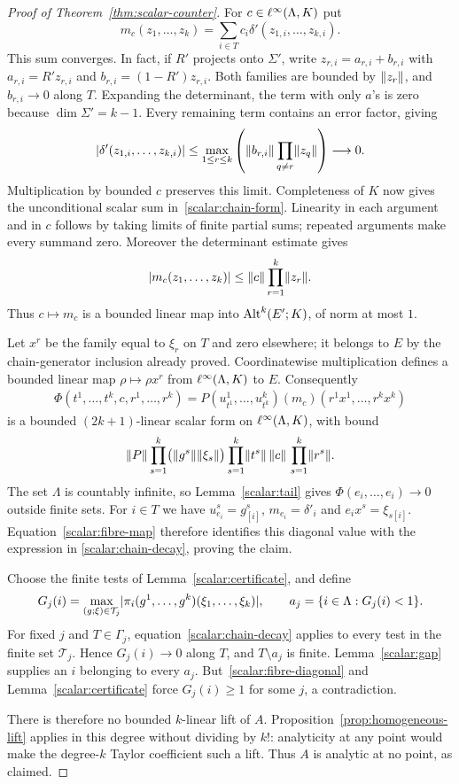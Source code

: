 \begin{proof}[Proof of Theorem~\ref{thm:scalar-counter}]
For $c\in\ell^\infty(\Lambda,K)$ put
\begin{equation}\label{scalar:chain-form}
 m_c(z_1,\dots,z_k)=\sum_{i\in T}c_i\delta'(z_{1,i},\dots,z_{k,i}).
\end{equation}
This sum converges. In fact, if $R'$ projects onto $\Sigma'$, write
$z_{r,i}=a_{r,i}+b_{r,i}$ with $a_{r,i}=R'z_{r,i}$ and $b_{r,i}=(1-R')z_{r,i}$. Both families are bounded
by $\lVert z_r\rVert$, and $b_{r,i}\to0$ along $T$. Expanding the determinant, the term with only $a$'s is
zero because $\dim\Sigma'=k-1$. Every remaining term contains an error factor, giving
\[
 \lvert \delta'(z_{1,i},\dots,z_{k,i})\rvert
 \le\max_{1\le r\le k}\left(\lVert b_{r,i}\rVert\prod_{q\ne r}\lVert z_q\rVert\right)
 \longrightarrow0.
\]
Multiplication by bounded $c$ preserves this limit. Completeness of $K$ now gives the unconditional
scalar sum in~\eqref{scalar:chain-form}. Linearity in each argument and in $c$ follows by taking limits
of finite partial sums; repeated arguments make every summand zero. Moreover the determinant estimate gives
\[
 \lvert m_c(z_1,\dots,z_k)\rvert\le\lVert c\rVert\prod_{r=1}^k\lVert z_r\rVert.
\]
Thus $c\mapsto m_c$ is a bounded linear map into $\operatorname{Alt}^k(E';K)$, of norm at most $1$.

Let $x^r$ be the family equal to $\xi_r$ on $T$ and zero elsewhere; it belongs to $E$ by the
chain-generator inclusion already proved. Coordinatewise multiplication defines a bounded linear map
$\rho\mapsto\rho x^r$ from $\ell^\infty(\Lambda,K)$ to $E$. Consequently
\[
 \begin{split}
 \Phi(t^1,\dots,t^k,c,r^1,\dots,r^k)
   =P(u^1_{t^1},\dots,u^k_{t^k})(m_c)(r^1x^1,\dots,r^kx^k)
 \end{split}
\]
is a bounded $(2k+1)$\nobreakdash-linear scalar form on $\ell^\infty(\Lambda,K)$, with bound
\[
 \lVert P\rVert\prod_{s=1}^k\bigl(\lVert g^s\rVert\lVert \xi_s\rVert\bigr)
       \prod_{s=1}^k\lVert t^s\rVert\,\lVert c\rVert\,\prod_{s=1}^k\lVert r^s\rVert.
\]
The set $\Lambda$ is countably infinite, so Lemma~\ref{scalar:tail} gives
$\Phi(e_i,\dots,e_i)\to0$ outside finite sets. For $i\in T$ we have
$u^s_{e_i}=g^s_{[i]}$, $m_{e_i}=\delta'_i$ and $e_i x^s=\xi_{s[i]}$.
Equation~\eqref{scalar:fibre-map} therefore identifies this diagonal value with the expression in
\eqref{scalar:chain-decay}, proving the claim.

Choose the finite tests of Lemma~\ref{scalar:certificate}, and define
\[
 G_j(i)=\max_{(g;\xi)\in\mathcal T_j}
       \lvert \pi_i(g^1,\dots,g^k)(\xi_1,\dots,\xi_k)\rvert,
 \qquad a_j=\{i\in\Lambda:G_j(i)<1\}.
\]
For fixed $j$ and $T\in\Gamma_j$, equation~\eqref{scalar:chain-decay} applies to every test in the finite
set $\mathcal T_j$. Hence $G_j(i)\to0$ along $T$, and $T\setminus a_j$ is finite. Lemma~\ref{scalar:gap}
supplies an $i$ belonging to every $a_j$. But~\eqref{scalar:fibre-diagonal} and
Lemma~\ref{scalar:certificate} force $G_j(i)\ge1$ for some $j$, a contradiction.

There is therefore no bounded $k$\nobreakdash-linear lift of $A$. Proposition~\ref{prop:homogeneous-lift} applies in
this degree without dividing by $k!$: analyticity at any point would make the degree-$k$ Taylor coefficient
such a lift. Thus $A$ is analytic at no point, as claimed.
\end{proof}
